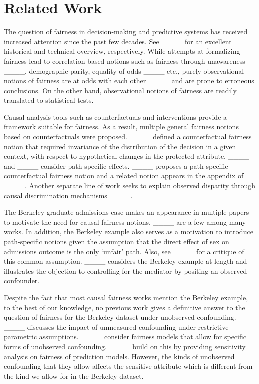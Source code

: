 \section{Related Work}
The question of fairness in decision-making and predictive systems has received increased attention since the past few decades. See ____ for an excellent historical  and technical overview, respectively. While attempts at formalizing fairness lead to correlation-based notions such as fairness through unawareness ____, demographic parity, equality of odds ____ etc., purely observational notions of fairness are at odds with each other ____ and are prone to erroneous conclusions. On the other hand, observational notions of fairness are readily translated to statistical tests.

Causal analysis tools such as counterfactuals and interventions provide a framework suitable for fairness. As a result, multiple general fairness notions based on counterfactuals were proposed.  ____ defined a counterfactual fairness notion that required invariance of the distribution of the decision in a given context, with respect to hypothetical changes in the protected attribute. ____ and ____ consider path-specific effects. ____ proposes a path-specific counterfactual fairness notion and a related notion appears in the appendix of ____. Another separate line of work seeks to explain observed disparity through causal discrimination mechanisms ____.

The Berkeley graduate admissions case makes an appearance in multiple papers to motivate the need for causal fairness notions. ____ are a few among many works. In addition, the Berkeley example also serves as a motivation to introduce path-specific notions given the assumption that the direct effect of sex on admissions outcome is the only `unfair' path. Also, see ____ for a critique of this common assumption. ____ considers the Berkeley example at length and illustrates the objection to controlling for the mediator by positing an observed confounder. 

Despite the fact that most causal fairness works mention the Berkeley example, to the best of our knowledge, no previous work gives a definitive answer to the question of fairness for the Berkeley dataset under unobserved confounding. ____ discusses the impact of unmeasured confounding under restrictive parametric assumptions. ____ consider fairness models that allow for specific forms of unobserved confounding. ____ build on this by providing sensitivity analysis on fairness of prediction models. However, the kinds of unobserved confounding that they allow affects the sensitive attribute which is different from the kind we allow for in the Berkeley dataset. 



